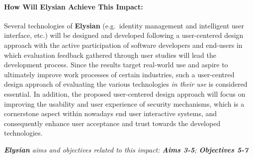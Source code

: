 \documentclass[a4paper,11pt]{article}
\newcommand{\project}[1]{\textbf{#1}\xspace}
\newcommand{\SECURITY}{\project{Elysian}}
\newcommand{\TheProject}{\SECURITY}
\begin{document}
\begin{mdframed}[backgroundcolor=gray!10]

\paragraph{How Will \TheProject{} Achieve This Impact:} Several technologies of \TheProject{} (e.g.~identity management and intelligent user interface, etc.) will be designed and developed following a user-centered design approach with the active participation of software developers and end-users in which evaluation feedback gathered through user studies will lead the development process. 
Since the results target real-world use and aspire to ultimately improve work processes of certain industries, such a user-centred design approach of evaluating the various technologies \emph{in their use} is considered essential. In addition, the proposed user-centered design approach will focus on improving the usability and user experience of security mechanisms, which is a cornerstone aspect within nowadays end user interactive systems, and consequently enhance user acceptance and trust towards the developed technologies.

\emph{\TheProject{} aims and objectives related to this impact: \textbf{Aims 3-5}; \textbf{Objectives 5-7} }
\end{mdframed}
\end{document}
